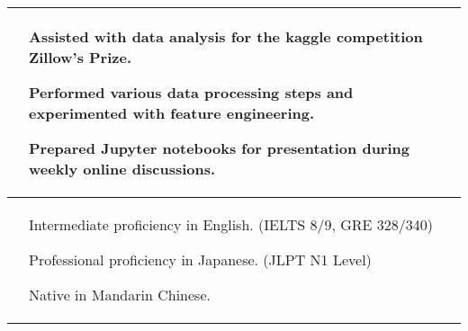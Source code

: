 \documentclass[$if(fontsize)$$fontsize$,$endif$$if(lang)$$babel-lang$,$endif$$if(papersize)$$papersize$paper,$endif$$for(classoption)$$classoption$$sep$,$endfor$]{$documentclass$}
\renewenvironment{itemize}{
  \begin{list}{}{
    \setlength{\leftmargin}{1em}  %
  }
}{
  \end{list}
}
\begin{document}
\begin{tabular}{>{\centering}p{2.5cm}|p{16.5cm}}
    & \vspace{-2mm}
      \begin{itemize}
        \item[\textbullet] Assisted with data analysis for the kaggle competition Zillow's Prize.
        \item[\textbullet] Performed various data processing steps and experimented with feature engineering.
        \item[\textbullet] Prepared Jupyter notebooks for presentation during weekly online discussions.
      \vspace{-4mm}
      \end{itemize}\\

    \midrule
    \multirow{3}{*}{\small\textbf{LANGUAGES}}
    & \vspace{-2mm}
      \begin{itemize}
        \item[\textbullet] Intermediate proficiency in English. \small (IELTS 8/9, GRE 328/340) \normalsize
        \item[\textbullet] Professional proficiency in Japanese. \small (JLPT N1 Level) \normalsize
        \item[\textbullet] Native in Mandarin Chinese.
      \vspace{-4mm}
      \end{itemize}\\


\end{tabular}
\end{document}
